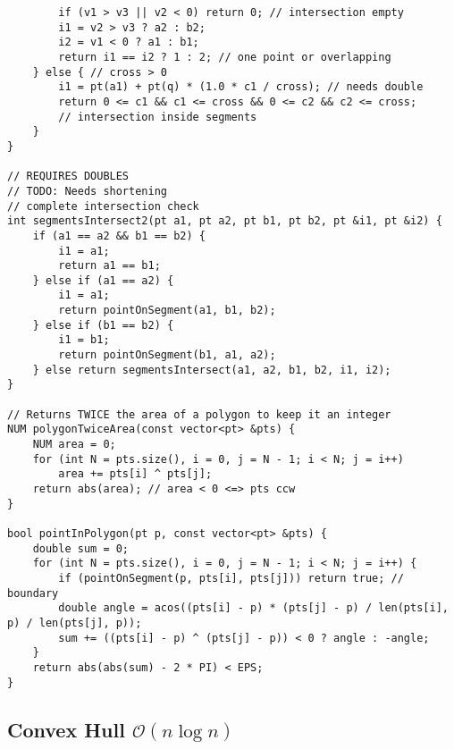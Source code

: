 \documentclass{article}
\begin{document}
\begin{lstlisting}
		if (v1 > v3 || v2 < 0) return 0; // intersection empty
		i1 = v2 > v3 ? a2 : b2;
		i2 = v1 < 0 ? a1 : b1;
		return i1 == i2 ? 1 : 2; // one point or overlapping
	} else { // cross > 0
		i1 = pt(a1) + pt(q) * (1.0 * c1 / cross); // needs double
		return 0 <= c1 && c1 <= cross && 0 <= c2 && c2 <= cross;
		// intersection inside segments
	}
}

// REQUIRES DOUBLES
// TODO: Needs shortening
// complete intersection check
int segmentsIntersect2(pt a1, pt a2, pt b1, pt b2, pt &i1, pt &i2) {
	if (a1 == a2 && b1 == b2) {
		i1 = a1;
		return a1 == b1;
	} else if (a1 == a2) {
		i1 = a1;
		return pointOnSegment(a1, b1, b2);
	} else if (b1 == b2) {
		i1 = b1;
		return pointOnSegment(b1, a1, a2);
	} else return segmentsIntersect(a1, a2, b1, b2, i1, i2);
}

// Returns TWICE the area of a polygon to keep it an integer
NUM polygonTwiceArea(const vector<pt> &pts) {
	NUM area = 0;
	for (int N = pts.size(), i = 0, j = N - 1; i < N; j = i++)
		area += pts[i] ^ pts[j];
	return abs(area); // area < 0 <=> pts ccw
}

bool pointInPolygon(pt p, const vector<pt> &pts) {
	double sum = 0;
	for (int N = pts.size(), i = 0, j = N - 1; i < N; j = i++) {
		if (pointOnSegment(p, pts[i], pts[j])) return true; // boundary
		double angle = acos((pts[i] - p) * (pts[j] - p) / len(pts[i], p) / len(pts[j], p));
		sum += ((pts[i] - p) ^ (pts[j] - p)) < 0 ? angle : -angle;
	}
	return abs(abs(sum) - 2 * PI) < EPS;
}
\end{lstlisting}

\begin{comment}
// Assumption: polygon has unique points
// 0: no, 1: yes, 2: on boundary
int pointInConvex(pt p, const vector<pt> &pts) {
bool onBoundary = false;
for (int N = pts.size(), sgn = 0, i = 0, j = N - 1; i < N; j = i++) {
NUM cross = (pts[i] - p) ^ (pts[j] - p);
int s = (cross > 0) - (cross < 0);
if (cross == 0) onBoundary = true;
else if (sgn == 0) sgn = s;
else if (sgn != s) return 0;
}
return onBoundary ? 2 : 1;
}
\end{comment}

\subsection{Convex Hull $\mathcal{O}(n \log n)$}
\end{document}
